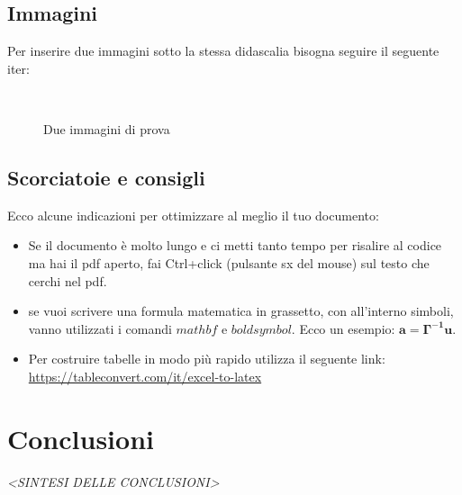 \documentclass[envcountsame,envcountchap]{svmono}
\begin{document}
\section{Immagini}

Per inserire due immagini sotto la stessa didascalia bisogna seguire il seguente iter:

\begin{figure}
    \centering
     \quad
     \\
\caption{Due immagini di prova}
\label{struttura}
\end{figure}


\section{Scorciatoie e consigli}

Ecco alcune indicazioni per ottimizzare al meglio il tuo documento:

\begin{itemize}
    \item Se il documento è molto lungo e ci metti tanto tempo
    per risalire al codice ma hai il pdf aperto, 
    fai Ctrl+click (pulsante sx del mouse) sul testo che cerchi nel pdf.
    \item se vuoi scrivere una formula matematica in grassetto, con all'interno simboli, vanno utilizzati
    i comandi $mathbf$ e $boldsymbol$. Ecco un esempio: $\mathbf{a=\boldsymbol{\Gamma}^{-1}u}$.
    \item Per costruire tabelle in modo più rapido utilizza il seguente link: \url{https://tableconvert.com/it/excel-to-latex}
\end{itemize}

    


\chapter*{Conclusioni}

\vspace{2cm}

\begin{flushright}
 \textit{<SINTESI DELLE CONCLUSIONI>}
\end{flushright}
\end{document}
